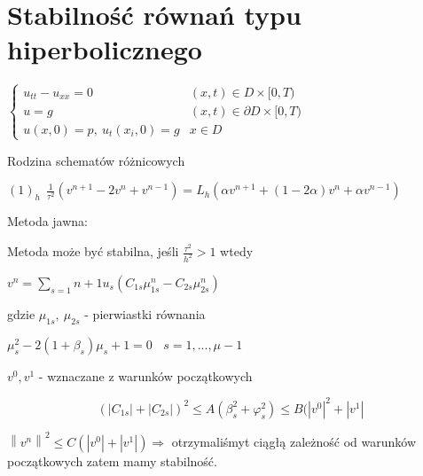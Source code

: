 \section{Stabilność równań typu hiperbolicznego}

$\left\{\begin{matrix} u_{tt} - u_{xx} = 0 & (x,t) \in D \times [0,T) \\ u = g & (x,t) \in \partial D \times [0,T) \\ u(x,0) = p,\ u_t(x_i,0) = g & x \in D \end{matrix}\right.$

Rodzina schematów różnicowych

$(1)_h\ \ \frac{1}{\tau ^2}(v^{n+1} - 2v^n + v^{n-1}) = L_h (\alpha v^{n+1} + (1 - 2\alpha)v^n + \alpha v^{n-1})$

Metoda jawna:

Metoda może być stabilna, jeśli $\frac{\tau ^2}{h^2} > 1$ wtedy

$v^n = \sum_{s=1}{n+1} u_s(C_{1s} \mu_{1s}^n - C_{2s} \mu_{2s}^n)$

gdzie $\mu_{1s},\ \mu_{2s}$ - pierwiastki równania

$\mu_s^2 - 2(1+ \beta _s)\mu_s + 1 = 0\ \ \ \ s = 1, ..., \mu -1$

$v^0,v^1$ - wznaczane z warunków początkowych

\[ (\left | C_{1s} \right | + \left | C_{2s} \right |)^2 \leqslant A(\beta_s^2 + \varphi_s^2) \leqslant B(\left | v^0 \right |^2 + \left | v^1 \right | \]

$\left \| v^n \right \|^2 \leqslant C(\left | v^0 \right | + \left | v^1 \right |) \Rightarrow$ otrzymaliśmyt ciągłą zależność od warunków początkowych zatem mamy stabilność.
